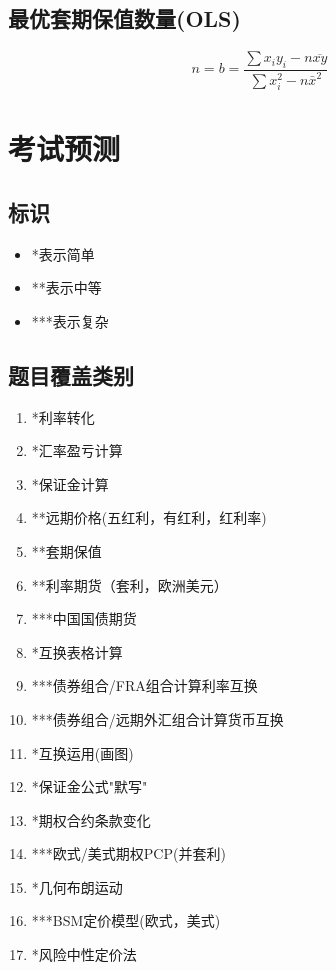 \documentclass{article}
\begin{document}
\subsection{最优套期保值数量(OLS)}
\[n=b=\frac{\sum x_i y_i-n \overline{x y}}{\sum x_i^2-n \bar{x}^2}\]

\section{考试预测}
\subsection{标识}
\begin{itemize}
    \item *表示简单
    \item **表示中等
    \item ***表示复杂
\end{itemize}
\subsection{题目覆盖类别}
\begin{enumerate}
\item *利率转化
\item *汇率盈亏计算
\item *保证金计算
\item **远期价格(五红利，有红利，红利率)
\item **套期保值
\item **利率期货（套利，欧洲美元）
\item ***中国国债期货
\item *互换表格计算
\item ***债券组合/FRA组合计算利率互换
\item ***债券组合/远期外汇组合计算货币互换
\item *互换运用(画图)
\item *保证金公式"默写"
\item *期权合约条款变化
\item ***欧式/美式期权PCP(并套利)
\item *几何布朗运动
\item ***BSM定价模型(欧式，美式)
\item *风险中性定价法
\end{enumerate}
\end{document}
